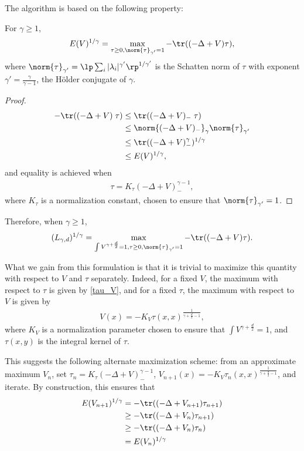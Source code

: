 \documentclass[10pt,a4paper,reqno]{amsart}
\begin{document}
The algorithm is based on the following property:
\begin{proposition}
  For $\gamma \geq 1$,
  \begin{align*}
  E(V)^{1/\gamma} = \max_{\tau \geq 0, \norm{\tau}_{\gamma'} = 1} - \tr((-\Delta + V)\tau),
\end{align*}
where $\norm{\tau}_{\gamma'} = \lp\sum_{i}
|\lambda_{i}|^{\gamma'}\rp^{1/\gamma'}$ is the Schatten norm of $\tau$
with exponent $\gamma' = \frac {\gamma}{\gamma - 1}$, the Hölder
conjugate of $\gamma$.
\end{proposition}
\begin{proof}
  \begin{align*}
    -\tr((-\Delta + V)\; \tau) &\leq \tr ((-\Delta + V)_{-} \;\tau)\\
   &\leq \norm{(-\Delta + V)_{-}}_{\gamma} \norm{\tau}_{\gamma'}\\
   &\leq \tr((-\Delta + V)_{-}^{\gamma})^{1/\gamma}\\
   &\leq E(V)^{1/\gamma},
 \end{align*}
 and equality is achieved when
 \begin{align}
   \label{tau_V}
   \tau = K_{\tau} (-\Delta + V)_{-}^{\gamma-1},
 \end{align}
 where $K_{\tau}$ is a normalization constant, chosen to ensure that
 $\norm{\tau}_{\gamma'} = 1$.
 
\end{proof}

Therefore, when $\gamma \geq 1$,
\begin{align*}
  (L_{\gamma,d})^{1/\gamma} = \max_{\int V^{\gamma+\frac d 2} = 1, \tau \geq
    0, \norm{\tau}_{\gamma'} = 1} -\tr ((-\Delta+V)\tau).
\end{align*}

What we gain from this formulation is that it is trivial to maximize
this quantity with respect to $V$ and $\tau$ separately. Indeed, for a
fixed $V$, the maximum with respect to $\tau$ is given by
\eqref{tau_V}, and for a fixed $\tau$, the maximum with respect to $V$
is given by
\begin{align*}
  V(x) = -K_{V} \tau(x,x)^{\frac 1 {\gamma + \frac d 2 - 1}},
\end{align*}
where  $K_{V}$ is a normalization parameter chosen to ensure that $\int
V^{\gamma + \frac d 2} = 1$, and $\tau(x,y)$ is the integral kernel of
$\tau$.

This suggests the following alternate maximization scheme: from an
approximate maximum $V_{n}$, set $\tau_{n} = K_{\tau} (-\Delta +
V)_{-}^{\gamma-1}$, $V_{n+1}(x) = -K_{V} \tau_{n}(x,x)^{\frac 1
  {\gamma + \frac d 2 - 1}}$, and iterate. By construction, this
ensures that
\begin{align*}
  E(V_{n+1})^{1/\gamma} &= - \tr((-\Delta+V_{n+1}) \tau_{n+1})\\
  &\geq -\tr((-\Delta+V_{n}) \tau_{n+1})\\
  &\geq -\tr((-\Delta+V_{n}) \tau_n)\\
  &= E(V_{n})^{1/\gamma}
\end{align*}
\end{document}
